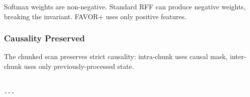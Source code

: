 Softmax weights are non-negative. Standard RFF can produce negative 
weights, breaking the invariant. FAVOR+ uses only positive features.

\subsubsection{Causality Preserved}

The chunked scan preserves strict causality: intra-chunk uses causal mask, 
inter-chunk uses only previously-processed state.
\begin{lstlisting}

---
\end{lstlisting}